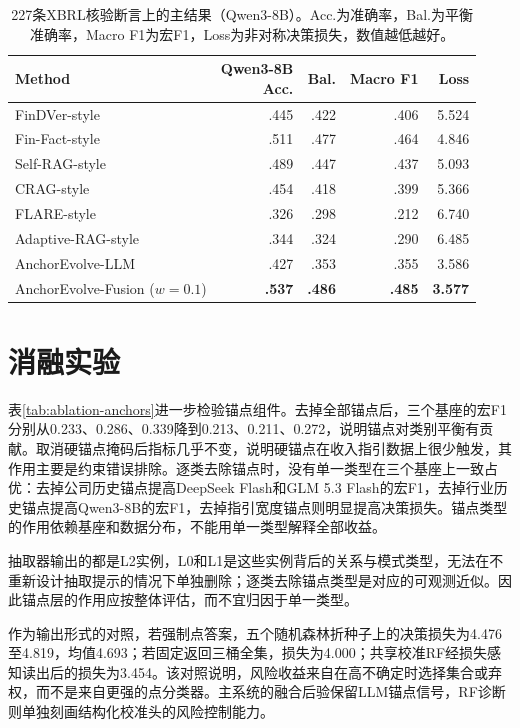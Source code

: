 \begin{table}[t]
\centering
{}
\setlength{\tabcolsep}{4pt}
\caption{227条XBRL核验断言上的主结果（Qwen3-8B）。Acc.为准确率，Bal.为平衡准确率，Macro F1为宏F1，Loss为非对称决策损失，数值越低越好。}
\label{tab:vague-qwen-main}
\begin{tabular}{lrrrr}
\toprule
Method & \shortstack{Qwen3-8B\\Acc.} & Bal. & Macro F1 & Loss \\
\midrule
FinDVer-style & .445 & .422 & .406 & 5.524 \\
Fin-Fact-style & .511 & .477 & .464 & 4.846 \\
Self-RAG-style & .489 & .447 & .437 & 5.093 \\
CRAG-style & .454 & .418 & .399 & 5.366 \\
FLARE-style & .326 & .298 & .212 & 6.740 \\
Adaptive-RAG-style & .344 & .324 & .290 & 6.485 \\
\midrule
AnchorEvolve-LLM & .427 & .353 & .355 & 3.586 \\
AnchorEvolve-Fusion ($w=0.1$) & \textbf{.537} & \textbf{.486} & \textbf{.485} & \textbf{3.577} \\
\bottomrule
\end{tabular}
\end{table}

\FloatBarrier
\section{消融实验}

表\ref{tab:ablation-anchors}进一步检验锚点组件。去掉全部锚点后，三个基座的宏F1分别从0.233、0.286、0.339降到0.213、0.211、0.272，说明锚点对类别平衡有贡献。取消硬锚点掩码后指标几乎不变，说明硬锚点在收入指引数据上很少触发，其作用主要是约束错误排除。逐类去除锚点时，没有单一类型在三个基座上一致占优：去掉公司历史锚点提高DeepSeek Flash和GLM 5.3 Flash的宏F1，去掉行业历史锚点提高Qwen3-8B的宏F1，去掉指引宽度锚点则明显提高决策损失。锚点类型的作用依赖基座和数据分布，不能用单一类型解释全部收益。

抽取器输出的都是L2实例，L0和L1是这些实例背后的关系与模式类型，无法在不重新设计抽取提示的情况下单独删除；逐类去除锚点类型是对应的可观测近似。因此锚点层的作用应按整体评估，而不宜归因于单一类型。

作为输出形式的对照，若强制点答案，五个随机森林折种子上的决策损失为4.476至4.819，均值4.693；若固定返回三桶全集，损失为4.000；共享校准RF经损失感知读出后的损失为3.454。该对照说明，风险收益来自在高不确定时选择集合或弃权，而不是来自更强的点分类器。主系统的融合后验保留LLM锚点信号，RF诊断则单独刻画结构化校准头的风险控制能力。

